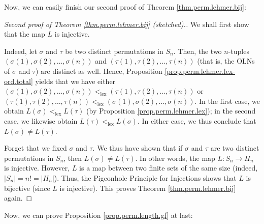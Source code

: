 Now, we can easily finish our second proof of Theorem
\ref{thm.perm.lehmer.bij}:

\begin{proof}
[Second proof of Theorem \ref{thm.perm.lehmer.bij} (sketched).]We shall first
show that the map $L$ is injective.

Indeed, let $\sigma$ and $\tau$ be two distinct permutations in $S_{n}$. Then,
the two $n$-tuples $\left(  \sigma\left(  1\right)  ,\sigma\left(  2\right)
,\ldots,\sigma\left(  n\right)  \right)  $ and $\left(  \tau\left(  1\right)
,\tau\left(  2\right)  ,\ldots,\tau\left(  n\right)  \right)  $ (that is, the
OLNs of $\sigma$ and $\tau$) are distinct as well. Hence, Proposition
\ref{prop.perm.lehmer.lex-ord.total} yields that we have either $\left(
\sigma\left(  1\right)  ,\sigma\left(  2\right)  ,\ldots,\sigma\left(
n\right)  \right)  <_{\operatorname*{lex}}\left(  \tau\left(  1\right)
,\tau\left(  2\right)  ,\ldots,\tau\left(  n\right)  \right)  $ or $\left(
\tau\left(  1\right)  ,\tau\left(  2\right)  ,\ldots,\tau\left(  n\right)
\right)  <_{\operatorname*{lex}}\left(  \sigma\left(  1\right)  ,\sigma\left(
2\right)  ,\ldots,\sigma\left(  n\right)  \right)  $. In the first case, we
obtain $L\left(  \sigma\right)  <_{\operatorname*{lex}}L\left(  \tau\right)  $
(by Proposition \ref{prop.perm.lehmer.lex}); in the second case, we likewise
obtain $L\left(  \tau\right)  <_{\operatorname*{lex}}L\left(  \sigma\right)
$. In either case, we thus conclude that $L\left(  \sigma\right)  \neq
L\left(  \tau\right)  $.

Forget that we fixed $\sigma$ and $\tau$. We thus have shown that if $\sigma$
and $\tau$ are two distinct permutations in $S_{n}$, then $L\left(
\sigma\right)  \neq L\left(  \tau\right)  $. In other words, the map
$L:S_{n}\rightarrow H_{n}$ is injective. However, $L$ is a map between two
finite sets of the same size (indeed, $\left\vert S_{n}\right\vert
=n!=\left\vert H_{n}\right\vert $). Thus, the Pigeonhole Principle for
Injections shows that $L$ is bijective (since $L$ is injective). This proves
Theorem \ref{thm.perm.lehmer.bij} again.
\end{proof}

Now, we can prove Proposition \ref{prop.perm.length.gf} at last:


